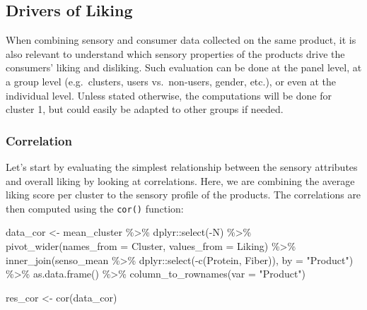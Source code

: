 \documentclass[
]{krantz}
\makeatletter
\newenvironment{Shaded}{\begin{snugshade}}{\end{snugshade}}
\newcommand{\AttributeTok}[1]{\textcolor[rgb]{0.61,0.61,0.61}{#1}}
\newcommand{\FunctionTok}[1]{\textcolor[rgb]{0,0,0}{#1}}
\newcommand{\NormalTok}[1]{#1}
\newcommand{\OtherTok}[1]{\textcolor[rgb]{0.37,0.37,0.37}{#1}}
\newcommand{\SpecialCharTok}[1]{\textcolor[rgb]{0,0,0}{#1}}
\newcommand{\StringTok}[1]{\textcolor[rgb]{0.5,0.5,0.5}{#1}}
\newenvironment{kframe}{%
\medskip{}
\setlength{\fboxsep}{.8em}
 \def\at@end@of@kframe{}%
 \ifinner\ifhmode%
  \def\at@end@of@kframe{\end{minipage}}%
  \begin{minipage}{\columnwidth}%
 \fi\fi%
 \def\FrameCommand##1{\hskip\@totalleftmargin \hskip-\fboxsep
 \colorbox{shadecolor}{##1}\hskip-\fboxsep
     \hskip-\linewidth \hskip-\@totalleftmargin \hskip\columnwidth}%
 \MakeFramed {\advance\hsize-\width
   \@totalleftmargin\z@ \linewidth\hsize
   \@setminipage}}%
 {\par\unskip\endMakeFramed%
 \at@end@of@kframe}
\renewenvironment{Shaded}{\begin{kframe}}{\end{kframe}}
\makeatother
\begin{document}
\hypertarget{drivers-of-liking}{%
\subsection{Drivers of Liking}\label{drivers-of-liking}}

When combining sensory and consumer data collected on the same product, it is also relevant to understand which sensory properties of the products drive the consumers' liking and disliking. Such evaluation can be done at the panel level, at a group level (e.g.~clusters, users vs.~non-users, gender, etc.), or even at the individual level. Unless stated otherwise, the computations will be done for cluster 1, but could easily be adapted to other groups if needed.

\hypertarget{correlation}{%
\subsubsection{Correlation}\label{correlation}}

Let's start by evaluating the simplest relationship between the sensory attributes and overall liking by looking at correlations. Here, we are combining the average liking score per cluster to the sensory profile of the products. The correlations are then computed using the \texttt{cor()} function:

\begin{Shaded}
\begin{Highlighting}[]
\NormalTok{data\_cor }\OtherTok{\textless{}{-}}\NormalTok{ mean\_cluster }\SpecialCharTok{\%\textgreater{}\%}
\NormalTok{  dplyr}\SpecialCharTok{::}\FunctionTok{select}\NormalTok{(}\SpecialCharTok{{-}}\NormalTok{N) }\SpecialCharTok{\%\textgreater{}\%}
  \FunctionTok{pivot\_wider}\NormalTok{(}\AttributeTok{names\_from =}\NormalTok{ Cluster, }\AttributeTok{values\_from =}\NormalTok{ Liking) }\SpecialCharTok{\%\textgreater{}\%}
  \FunctionTok{inner\_join}\NormalTok{(senso\_mean }\SpecialCharTok{\%\textgreater{}\%}\NormalTok{ dplyr}\SpecialCharTok{::}\FunctionTok{select}\NormalTok{(}\SpecialCharTok{{-}}\FunctionTok{c}\NormalTok{(Protein, Fiber)), }\AttributeTok{by =} \StringTok{"Product"}\NormalTok{) }\SpecialCharTok{\%\textgreater{}\%}
  \FunctionTok{as.data.frame}\NormalTok{() }\SpecialCharTok{\%\textgreater{}\%}
  \FunctionTok{column\_to\_rownames}\NormalTok{(}\AttributeTok{var =} \StringTok{"Product"}\NormalTok{)}

\NormalTok{res\_cor }\OtherTok{\textless{}{-}} \FunctionTok{cor}\NormalTok{(data\_cor)}
\end{Highlighting}
\end{Shaded}
\end{document}
